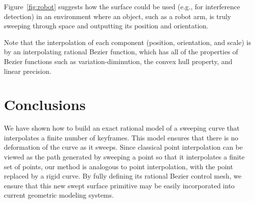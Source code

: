 \begin{example}
Figure~\ref{fig:robot} suggests how the surface could be used (e.g., for 
interference detection) in an environment
where an object, such as a robot arm, is truly sweeping through space
and outputting its position and orientation.
\end{example}


Note that the interpolation of each component (position, orientation,
and scale) is by an interpolating 
rational Bezier function, which has all of the properties of Bezier
functions such as variation-diminution, the convex hull property,
and linear precision.

\section{Conclusions}

We have shown how to build an exact rational model of a sweeping curve
that interpolates a finite number of keyframes.
This model ensures that there is no deformation of the curve as it sweeps.
Since classical point interpolation can be viewed as the path generated
by sweeping a point so that it interpolates a finite set of points,
our method is analogous to point interpolation, with the point replaced
by a rigid curve.
By fully defining its rational Bezier control mesh, we ensure that
this new swept surface primitive may be easily incorporated into
current geometric modeling systems.




